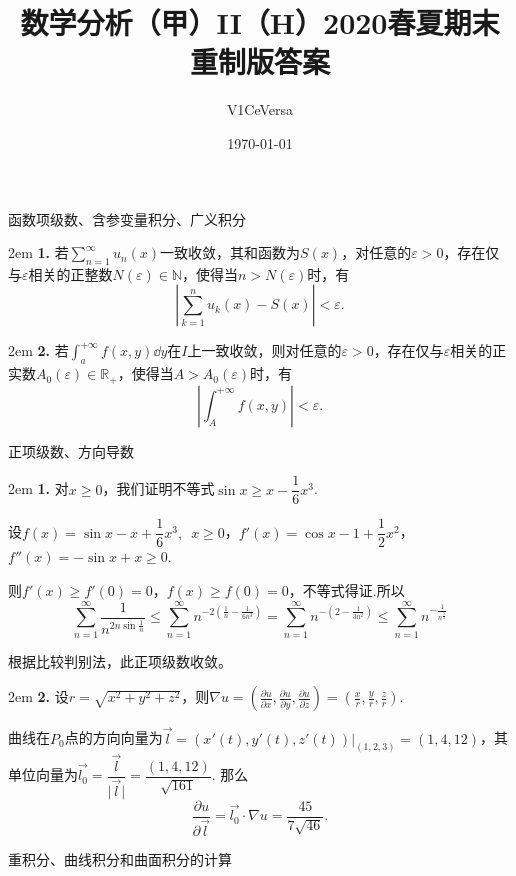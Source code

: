 \documentclass[UTF8,14pt,normal]{ctexart}
\title{数学分析（甲）II（H）2020春夏期末\enspace 重制版答案}
\author{V1CeVersa}
\date{\today}
\begin{document}
\maketitle

 函数项级数、含参变量积分、广义积分

    \hangindent 2em
    \noindent
    \textbf{1.}
    若\(\sum\limits_{n=1}^{\infty}u_n(x)\)一致收敛，其和函数为\(S(x)\)，对任意的\(\varepsilon>0\)，存在仅与\(\varepsilon\)相关的正整数\(N(\varepsilon)\in\mathbb{N}\)，使得当\(n>N(\varepsilon)\)时，有\[\left|\sum_{k=1}^{n}u_k(x)-S(x)\right|<\varepsilon.\]

    \hangindent 2em
    \noindent
    \textbf{2.}
    若\(\displaystyle\int_{a}^{+\infty}f(x,y)\dd y\)在\(I\)上一致收敛，则对任意的\(\varepsilon>0\)，存在仅与\(\varepsilon\)相关的正实数\(A_0(\varepsilon)\in\mathbb{R}_{+}\)，使得当\(A>A_0(\varepsilon)\)时，有\[\left|\int_{A}^{+\infty}f(x,y)\right|<\varepsilon.\]

 正项级数、方向导数

    \hangindent 2em
    \noindent    
    \textbf{1.}
    对\(x\geqslant0\)，我们证明不等式\(\sin x\geqslant x-\dfrac{1}{6}x^3\).

    设\(f(x)=\sin x-x +\dfrac{1}{6}x^3,\enspace x\geqslant0\)，\(f'(x) = \cos x -1 +\dfrac{1}{2}x^2\)，\(f''(x) = -\sin x+x\geqslant0\).

    则\(f'(x)\geqslant f'(0) = 0\)，\(f(x)\geqslant f(0)= 0\)，不等式得证.所以
    \[\sum_{n=1}^{\infty}\frac{1}{n^{2n\sin\frac{1}{n}}}\leqslant\sum_{n=1}^{\infty}n^{-2(\frac{1}{n}-\frac{1}{6n^3})} = \sum_{n=1}^{\infty}n^{-(2-\frac{1}{3n^2})}\leqslant\sum_{n=1}^{\infty}n^{-\frac{1}{n^\frac{5}{3}}}\]
 
    根据比较判别法，此正项级数收敛。

    \hangindent 2em
    \noindent    
    \textbf{2.}
    设\(r=\sqrt{x^2+y^2+z^2}\)，则\(\nabla u = \left(\frac{\partial u}{\partial x},\frac{\partial u}{\partial y},\frac{\partial u}{\partial z}\right) = \left(\frac{x}{r},\frac{y}{r},\frac{z}{r}\right)\).

    曲线在\(P_0\)点的方向向量为\(\vec{l} = \left(x'(t),y'(t),z'(t)\right)\bigg|_{(1,2,3)} = (1,4,12)\)，其单位向量为\(\vec{l_0} = \dfrac{\vec{l}}{\vert\vec{l}\vert} = \dfrac{(1,4,12)}{\sqrt{161}}\).
    那么\[\frac{\partial u}{\partial \vec{l}} = \vec{l_0}\cdot\nabla u = \frac{45}{7\sqrt{46}}.\]

 重积分、曲线积分和曲面积分的计算
\end{document}
